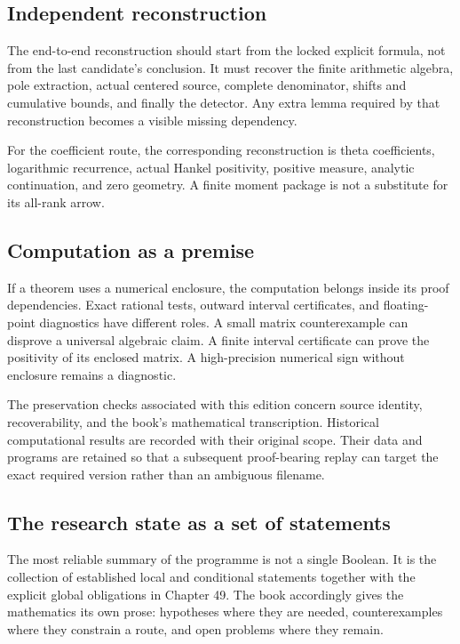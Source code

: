 \documentclass[
  10pt,
  a4paper,
  10pt,
  oneside,
  openany]{book}
\begin{document}
\subsection{Independent
reconstruction}\label{independent-reconstruction}

The end-to-end reconstruction should start from the locked explicit
formula, not from the last candidate's conclusion. It must recover the
finite arithmetic algebra, pole extraction, actual centered source,
complete denominator, shifts and cumulative bounds, and finally the
detector. Any extra lemma required by that reconstruction becomes a
visible missing dependency.

For the coefficient route, the corresponding reconstruction is theta
coefficients, logarithmic recurrence, actual Hankel positivity, positive
measure, analytic continuation, and zero geometry. A finite moment
package is not a substitute for its all-rank arrow.

\subsection{Computation as a premise}\label{computation-as-a-premise}

If a theorem uses a numerical enclosure, the computation belongs inside
its proof dependencies. Exact rational tests, outward interval
certificates, and floating-point diagnostics have different roles. A
small matrix counterexample can disprove a universal algebraic claim. A
finite interval certificate can prove the positivity of its enclosed
matrix. A high-precision numerical sign without enclosure remains a
diagnostic.

The preservation checks associated with this edition concern source
identity, recoverability, and the book's mathematical transcription.
Historical computational results are recorded with their original scope.
Their data and programs are retained so that a subsequent proof-bearing
replay can target the exact required version rather than an ambiguous
filename.

\subsection{The research state as a set of
statements}\label{the-research-state-as-a-set-of-statements}

The most reliable summary of the programme is not a single Boolean. It
is the collection of established local and conditional statements
together with the explicit global obligations in Chapter 49. The book
accordingly gives the mathematics its own prose: hypotheses where they
are needed, counterexamples where they constrain a route, and open
problems where they remain.
\end{document}
